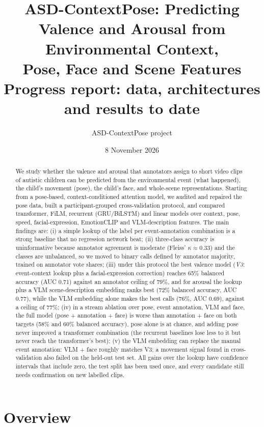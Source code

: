 \documentclass[11pt]{article}
\title{ASD-ContextPose: Predicting Valence and Arousal from Environmental Context,\\Pose, Face and Scene Features\\[4pt]\large Progress report: data, architectures and results to date}
\author{ASD-ContextPose project}
\date{8 November 2026}
\begin{document}
\maketitle

\begin{abstract}
We study whether the valence and arousal that annotators assign to short video clips of autistic children can be predicted from the environmental event (what happened), the child's movement (pose), the child's face, and whole-scene representations. Starting from a pose-based, context-conditioned attention model, we audited and repaired the pose data, built a participant-grouped cross-validation protocol, and compared transformer, FiLM, recurrent (GRU/BiLSTM) and linear models over context, pose, speed, facial-expression, EmotionCLIP and VLM-description features. The main findings are: (i) a simple lookup of the label per event-annotation combination is a strong baseline that no regression network beat; (ii) three-class accuracy is uninformative because annotator agreement is moderate (Fleiss' $\kappa \approx 0.33$) and the classes are unbalanced, so we moved to binary calls defined by annotator majority, trained on annotator vote shares; (iii) under this protocol the best valence model (\emph{V3}: event-context lookup plus a facial-expression correction) reaches 65\% balanced accuracy (AUC 0.71) against an annotator ceiling of 79\%, and for arousal the lookup plus a VLM scene-description embedding ranks best (72\% balanced accuracy, AUC 0.77), while the VLM embedding alone makes the best calls (76\%, AUC 0.69), against a ceiling of 77\%; (iv) in a stream ablation over pose, event annotation, VLM and face, the full model (pose + annotation + face) is worse than annotation + face on both targets (58\% and 60\% balanced accuracy), pose alone is at chance, and adding pose never improved a transformer combination (the recurrent baselines lose less to it but never reach the transformer's best); (v) the VLM embedding can replace the manual event annotation: VLM + face roughly matches V3; a movement signal found in cross-validation also failed on the held-out test set. All gains over the lookup have confidence intervals that include zero, the test split has been used once, and every candidate still needs confirmation on new labelled clips.
\end{abstract}

\tableofcontents
\newpage

\section{Overview}
\end{document}
